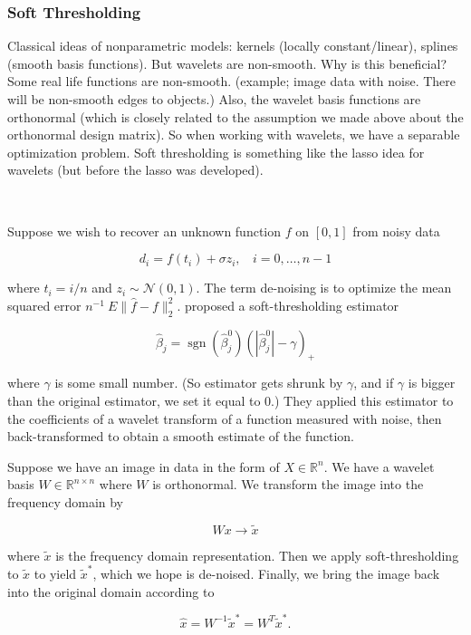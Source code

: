\subsubsection{Soft Thresholding}

Classical ideas of nonparametric models: kernels (locally constant/linear), splines (smooth basis functions). But wavelets are non-smooth. Why is this beneficial? Some real life functions are non-smooth. (example; image data with noise. There will be non-smooth edges to objects.) Also, the wavelet basis functions are orthonormal (which is closely related to the assumption we made above about the orthonormal design matrix). So when working with wavelets, we have a separable optimization problem. Soft thresholding is something like the lasso idea for wavelets (but before the lasso was developed).


\

Suppose we wish to recover an unknown function \(f\) on \([0,1]\) from noisy data

\[
d_i = f(t_i) + \sigma z_i, \ \ \ \ i=0, \ldots, n-1
\]

where \(t_i = i/n\) and \(z_i \sim \mathcal{N}(0,1)\). The term de-noising is to optimize the mean squared error \(n^{-1}\ E \lVert \hat{f} - f \rVert_2^2\). \citet{Donoho1994} proposed a soft-thresholding estimator

\[
\hat{\beta}_j = \operatorname{sgn}(\hat{\beta}_j^0) (| \hat{\beta}_j^0| - \gamma)_+
\]

where \(\gamma\) is some small number. (So estimator gets shrunk by \(\gamma\), and if \(\gamma\) is bigger than the original estimator, we set it equal to 0.) They applied this estimator to the coefficients of a wavelet transform of a function measured with noise, then back-transformed to obtain a smooth estimate of the function.

\begin{example} Suppose we have an image in data in the form of \(X \in \mathbb{R}^n\). We have a wavelet basis \(W \in \mathbb{R}^{n \times n}\) where \(W\) is orthonormal. We transform the image into the frequency domain by

\[
W x \to \tilde{x}
\]

where \(\tilde{x}\) is the frequency domain representation. Then we apply soft-thresholding to \(\tilde{x}\) to yield \(\tilde{x}^*\), which we hope is de-noised. Finally, we bring the image back into the original domain according to

\[
\hat{x} = W^{-1}\tilde{x}^* = W^T \tilde{x}^*.
\]

\end{example}

